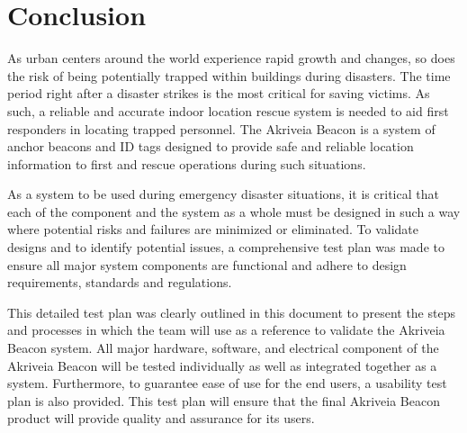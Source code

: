 

\setcounter{section}{6}
\section{Conclusion}
\bigskip

As urban centers around the world experience rapid growth and changes, so does the risk of being potentially trapped within buildings during disasters. The time period right after a disaster strikes is the most critical for saving victims. As such, a reliable and accurate indoor location rescue system is needed to aid first responders in locating trapped personnel. The Akriveia Beacon is a system of anchor beacons and ID tags designed to provide safe and reliable location information to first and rescue operations during such situations. 

\bigskip
As a system to be used during emergency disaster situations, it is critical that each of the component and the system as a whole must be designed in such a way where potential risks and failures are minimized or eliminated. To validate designs and to identify potential issues, a comprehensive test plan was made to ensure all major system components are functional and adhere to design requirements, standards and regulations. 

\bigskip
This detailed test plan was clearly outlined in this document to present the steps and processes in which the team will use as a reference to validate the Akriveia Beacon system. All major hardware, software, and electrical component of the Akriveia Beacon will be tested individually as well as integrated together as a system. Furthermore, to guarantee ease of use for the end users, a usability test plan is also provided. This test plan will ensure that the final Akriveia Beacon product will provide quality and assurance for its users.
